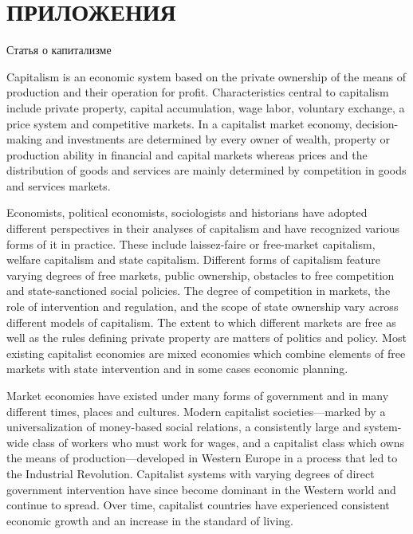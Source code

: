 \pagestyle{empty}
\chapter*{ПРИЛОЖЕНИЯ}

\begin{flushright}
{} 
\end{flushright}
\begin{center}
Статья о капитализме
\end{center}
Capitalism is an economic system based on the private ownership of the means of production and their operation for profit. Characteristics central to capitalism include private property, capital accumulation, wage labor, voluntary exchange, a price system and competitive markets. In a capitalist market economy, decision-making and investments are determined by every owner of wealth, property or production ability in financial and capital markets whereas prices and the distribution of goods and services are mainly determined by competition in goods and services markets.

Economists, political economists, sociologists and historians have adopted different perspectives in their analyses of capitalism and have recognized various forms of it in practice. These include laissez-faire or free-market capitalism, welfare capitalism and state capitalism. Different forms of capitalism feature varying degrees of free markets, public ownership, obstacles to free competition and state-sanctioned social policies. The degree of competition in markets, the role of intervention and regulation, and the scope of state ownership vary across different models of capitalism. The extent to which different markets are free as well as the rules defining private property are matters of politics and policy. Most existing capitalist economies are mixed economies which combine elements of free markets with state intervention and in some cases economic planning.

Market economies have existed under many forms of government and in many different times, places and cultures. Modern capitalist societies—marked by a universalization of money-based social relations, a consistently large and system-wide class of workers who must work for wages, and a capitalist class which owns the means of production—developed in Western Europe in a process that led to the Industrial Revolution. Capitalist systems with varying degrees of direct government intervention have since become dominant in the Western world and continue to spread. Over time, capitalist countries have experienced consistent economic growth and an increase in the standard of living.

